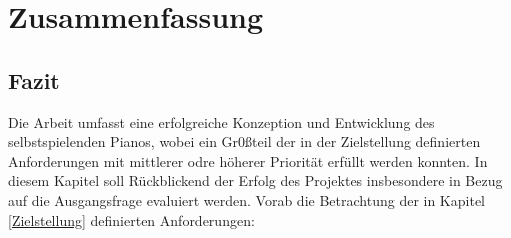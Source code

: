 
\chapter{Zusammenfassung} \label{fazit}

\section{Fazit}
Die Arbeit umfasst eine erfolgreiche Konzeption und Entwicklung des selbstspielenden Pianos, wobei ein Gr0ßteil der in der Zielstellung
definierten Anforderungen mit mittlerer odre höherer Priorität erfüllt werden konnten. In diesem Kapitel soll Rückblickend der Erfolg
des Projektes insbesondere in Bezug auf die Ausgangsfrage evaluiert werden.
\newline
Vorab die Betrachtung der in Kapitel \ref{Zielstellung} definierten Anforderungen:
